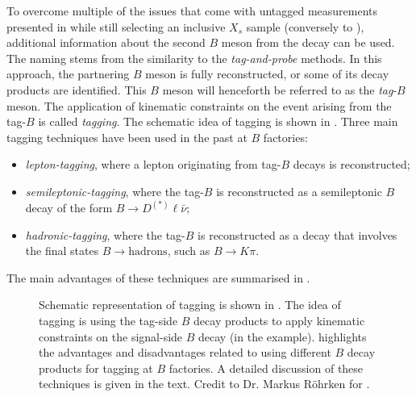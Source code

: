 To overcome multiple of the issues that come with untagged measurements presented in  
while still selecting an inclusive $X_s$ sample (conversely to ), 
additional information about the second $B$ meson from the \FourS decay can be used.
The naming stems from the similarity to the \textit{tag-and-probe} methods.
In this approach, the partnering $B$ meson is fully reconstructed, or some of its decay products are identified.
This $B$ meson will henceforth be referred to as the \textit{tag}-$B$ meson.
The application of kinematic constraints on the event arising from the tag-$B$ is called \textit{tagging}.
The schematic idea of tagging is shown in .
Three main tagging techniques have been used in the past at $B$ factories:
\begin{itemize}
    \item \textit{lepton-tagging}, where a lepton originating from tag-$B$ decays is reconstructed;
    \item \textit{semileptonic-tagging}, where the tag-$B$ is reconstructed as a semileptonic $B$ decay of the form $B\to D^{(*)}\ell\bar{\nu}$;
    \item \textit{hadronic-tagging}, where the tag-$B$ is reconstructed as a decay that involves the final states $B\to\mathrm{hadrons}$, such as $B\to K\pi$.
\end{itemize}
The main advantages of these techniques are summarised in .

\begin{figure}[htbp!]
    \centering
    \subcaptionbox{\label{fig:tagging_schematic}}{
        \resizebox{0.25\textwidth}{!}{
            
            }
    }
    \caption{\label{fig:tagging_drawins} Schematic representation of tagging is shown in .
    The idea of tagging is using the tag-side $B$ decay products to apply kinematic constraints on the signal-side $B$ decay (\BtoXsgamma in the example).
     highlights the advantages and disadvantages related to using different $B$ decay products for tagging at $B$ factories.
    A detailed discussion of these techniques is given in the text.
    Credit to Dr. Markus Röhrken for .}
\end{figure}

